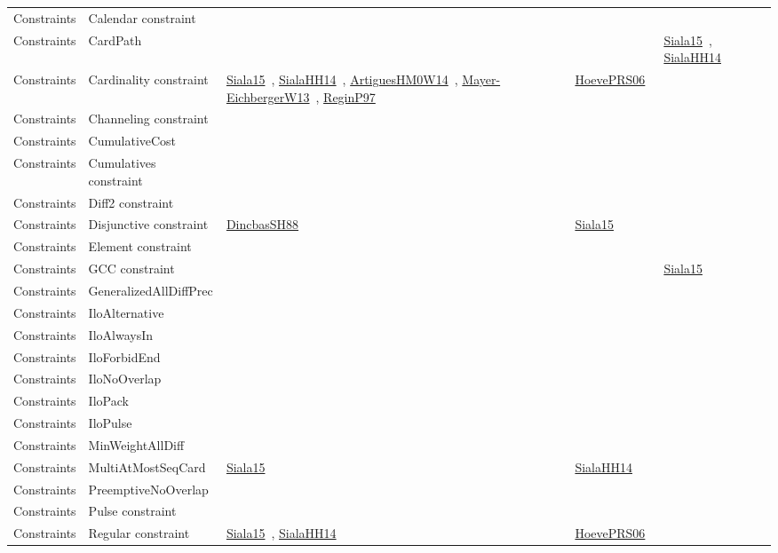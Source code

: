 {\begin{longtable}{lp{3cm}>{\raggedright\arraybackslash}p{6cm}>{\raggedright\arraybackslash}p{6cm}>{\raggedright\arraybackslash}p{8cm}}
Constraints & Calendar constraint &  &  & \\
Constraints & CardPath &  &  & \href{cars/works/Siala15.pdf}{Siala15}~\cite{Siala15}, \href{cars/works/SialaHH14.pdf}{SialaHH14}~\cite{SialaHH14}\\
Constraints & Cardinality constraint & \href{cars/works/Siala15.pdf}{Siala15}~\cite{Siala15}, \href{cars/works/SialaHH14.pdf}{SialaHH14}~\cite{SialaHH14}, \href{cars/works/ArtiguesHM0W14.pdf}{ArtiguesHM0W14}~\cite{ArtiguesHM0W14}, \href{cars/works/Mayer-EichbergerW13.pdf}{Mayer-EichbergerW13}~\cite{Mayer-EichbergerW13}, \href{cars/works/ReginP97.pdf}{ReginP97}~\cite{ReginP97} & \href{cars/works/HoevePRS06.pdf}{HoevePRS06}~\cite{HoevePRS06} & \\
Constraints & Channeling constraint &  &  & \\
Constraints & CumulativeCost &  &  & \\
Constraints & Cumulatives constraint &  &  & \\
Constraints & Diff2 constraint &  &  & \\
Constraints & Disjunctive constraint & \href{cars/works/DincbasSH88.pdf}{DincbasSH88}~\cite{DincbasSH88} & \href{cars/works/Siala15.pdf}{Siala15}~\cite{Siala15} & \\
Constraints & Element constraint &  &  & \\
Constraints & GCC constraint &  &  & \href{cars/works/Siala15.pdf}{Siala15}~\cite{Siala15}\\
Constraints & GeneralizedAllDiffPrec &  &  & \\
Constraints & IloAlternative &  &  & \\
Constraints & IloAlwaysIn &  &  & \\
Constraints & IloForbidEnd &  &  & \\
Constraints & IloNoOverlap &  &  & \\
Constraints & IloPack &  &  & \\
Constraints & IloPulse &  &  & \\
Constraints & MinWeightAllDiff &  &  & \\
Constraints & MultiAtMostSeqCard & \href{cars/works/Siala15.pdf}{Siala15}~\cite{Siala15} & \href{cars/works/SialaHH14.pdf}{SialaHH14}~\cite{SialaHH14} & \\
Constraints & PreemptiveNoOverlap &  &  & \\
Constraints & Pulse constraint &  &  & \\
Constraints & Regular constraint & \href{cars/works/Siala15.pdf}{Siala15}~\cite{Siala15}, \href{cars/works/SialaHH14.pdf}{SialaHH14}~\cite{SialaHH14} & \href{cars/works/HoevePRS06.pdf}{HoevePRS06}~\cite{HoevePRS06} & \\

\end{longtable}}
